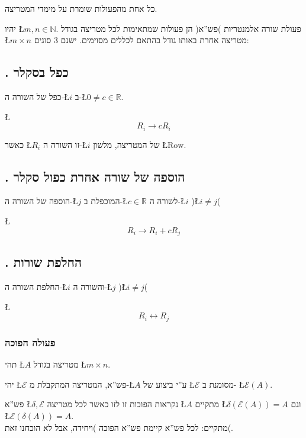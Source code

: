 \documentclass[english,hebrew]{article}
\begin{document}
כל אחת מהפעולות שומרת על מימדי המטריצה.

יהיו \L{$m,n\in\mathbb{N}$}. פעולת שורה אלמנטריות )פש\textquotedblright א(
הן פעולות שמתאימות לכל מטריצה בגודל \L{$m\times n$} מטריצה אחרת באותו
גודל בהתאם לכללים מסוימים. ישנם 3 סוגים:

\subsection{{\endL}. כפל בסקלר}

כפל של השורה ה-\L{$i$} ב-\L{$0\neq c\in\mathbb{R}$}.

\L{%
\[
R_{i}\to cR_{i}
\]
}%

כאשר \L{$R_{i}$} זו השורה ה-\L{$i$} של המטריצה, מלשון \L{$\text{Row}$}.

\subsection{{\endL}. הוספה של שורה אחרת כפול סקלר}

הוספה של השורה ה-\L{$j$} המוכפלת ב-\L{$c\in\mathbb{R}$} לשורה ה-\L{$i$}
)\L{$i\neq j$}(

\L{%
\[
R_{i}\to R_{i}+cR_{j}
\]
}%

\subsection{{\endL}. החלפת שורות}

החלפת השורה ה-\L{$i$} והשורה ה-\L{$j$} )\L{$i\neq j$}(

\L{%
\[
R_{i}\leftrightarrow R_{j}
\]
}%

\subsubsection{פעולה הפוכה}

תהי \L{$A$} מטריצה בגודל \L{$m\times n$}.

יהי \L{$\mathcal{E}$} פש\textquotedblright א, המטריצה המתקבלת מ-\L{$A$}
ע\textquotedblright י ביצוע של \L{$\mathcal{E}$} מסומנת ב- \L{$\mathcal{E}(A)$}.

פש\textquotedblright א \L{$\delta,\mathcal{E}$} נקראות הפוכות זו
לזו כאשר לכל מטריצה \L{$A$} מתקיים \L{$\delta(\mathcal{E}(A))=A$}
וגם \L{$\mathcal{E}(\delta(A))=A$}.\\

מתקיים: לכל פש\textquotedblright א קיימת פש\textquotedblright א הפוכה
)ויחידה, אבל לא הוכחנו זאת(.
\end{document}
